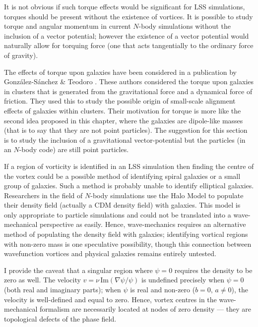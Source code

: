 It is not obvious if such torque effects would be significant for LSS simulations, torques should be present without the existence of vortices. It is possible to study torque and angular momentum in current $N$-body simulations without the inclusion of a vector potential; however the existence of a vector potential would naturally allow for torquing force (one that acts tangentially to the ordinary force of gravity).

The effects of torque upon galaxies have been considered in a publication by Gonz\'alez-S\'anchez \& Teodoro \citep{bib_gonz}. These authors considered the torque upon galaxies in clusters that is generated from the gravitational force and a dynamical force of friction. They used this to study the possible origin of small-scale alignment effects of galaxies within clusters. Their motivation for torque is more like the second idea proposed in this chapter, where the galaxies are dipole-like masses (that is to say that they are not point particles). The suggestion for this section is to study the inclusion of a gravitational vector-potential but the particles (in an $N$-body code) are still point particles.

If a region of vorticity is identified in an LSS simulation then finding the centre of the vortex could be a possible method of identifying spiral galaxies or a small group of galaxies. Such a method is probably unable to identify elliptical galaxies. Researchers in the field of $N$-body simulations use the Halo Model \citep{bib_halo} to populate their density field (actually a CDM density field) with galaxies. This model is only appropriate to particle simulations and could not be translated into a wave-mechanical perspective as easily. Hence, wave-mechanics requires an alternative method of populating the density field with galaxies; identifying vortical regions with non-zero mass is one speculative possibility, though this connection between wavefunction vortices and physical galaxies remains entirely untested.

I provide the caveat that a singular region where $\psi = 0$ requires the density to be zero as well. The velocity $v = \nu\, \mathrm{Im}(\nabla\psi/\psi)$ is undefined precisely when $\psi = 0$ (both real and imaginary parts); when $\psi$ is real and non-zero ($b = 0,\, a \neq 0$), the velocity is well-defined and equal to zero. Hence, vortex centres in the wave-mechanical formalism are necessarily located at nodes of zero density — they are topological defects of the phase field.

